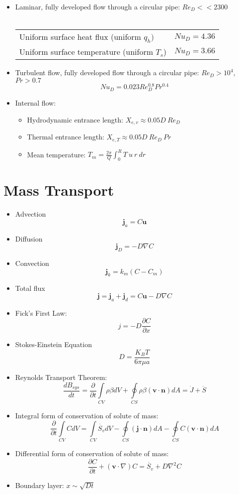 \documentclass[12pt,a4paper]{article}
\begin{document}
\begin{itemize}
	\item Laminar, fully developed flow through a circular pipe: $Re_{D}<<2300$\\\\
	\begin{tabular}{l l}
	 Uniform surface heat flux (uniform $q_{h})$ & $Nu_{D}=4.36$ \\ [1.3ex]  
	 Uniform surface temperature (uniform $T_{s}$) &  $Nu_{D}=3.66$	
	 \end{tabular}
	 
	 \item Turbulent flow, fully developed flow through a circular pipe: $Re_{D}>10^{4}$, $Pr>0.7$
	 \[Nu_{D} = 0.023 Re_{D}^{0.8}Pr^{0.4}\]

	\item Internal flow: 
	\begin{itemize}
	\item Hydrodynamic entrance length: $X_{e,v}\approx 0.05 D \ Re_{D}$
	\item Thermal entrance length: $X_{e,T} \approx 0.05 D \ Re_{D} \ Pr$
	\item Mean temperature: $T_{m} = \frac{2\pi}{Q}\int_{0}^{R}T\ u\ r\ dr$
	\end{itemize}
	\end{itemize}

\section{Mass Transport}
\begin{itemize}
	\item Advection \[\mathbf{j}_{a}=C\mathbf{u}\]
	\item Diffusion \[\mathbf{j}_{D}=-D\nabla C\]
	\item Convection \[\mathbf{j}_{k}=k_{m}(C-C_{m})\]
	\item Total flux \[\mathbf{j}=\mathbf{j}_{a}+\mathbf{j}_{d}=C\mathbf{u}-D\nabla C\]
	\item Fick's First Law: \[j = -D\frac{\partial C}{\partial x}\]
	\item Stokes-Einstein Equation \[D=\frac{K_{B}T}{6\pi \mu a}\]

	\item Reynolds Transport Theorem: \[ \frac{dB_{sys}}{dt}=\frac{\partial}{\partial t}\int\limits_{CV} \rho \beta dV+\oint\limits_{CS}\rho\beta(\mathbf{v}\cdot\mathbf{n})dA = \dot{J}+\dot{S}\]

 	\item Integral form of conservation of solute of mass: \[\frac{\partial}{\partial t} \int\limits_{CV} C dV = \int\limits_{CV} \dot{S_{v}} dV - \oint\limits_{CS} (\mathbf{j} \cdot \mathbf{n}) dA - \oint\limits_{CS} C (\mathbf{v} \cdot \mathbf{n}) dA \]

	\item Differential form of conservation of solute of mass: \[\frac{\partial C}{\partial t} +(\mathbf{v} \cdot \nabla)  C = \dot{S_{v}}  + D \nabla^{2} C \]
	\item Boundary layer: $x  \sim  \sqrt{D t}$
\end{itemize}

\vspace*{\fill}
\end{document}
